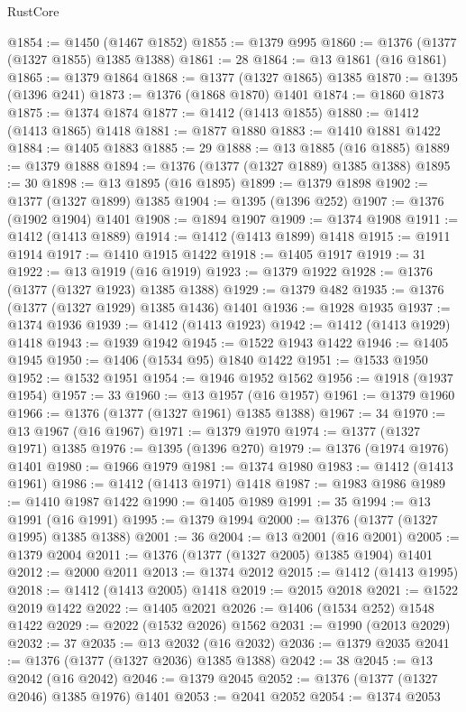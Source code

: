 \begin{lexlean}{RustCore}
\begin{coremodule}
@1854 := @1450 (@1467 @1852)
@1855 := @1379 @995
@1860 := @1376 (@1377 (@1327 @1855) @1385 @1388)
@1861 := 28
@1864 := @13 @1861 (@16 @1861)
@1865 := @1379 @1864
@1868 := @1377 (@1327 @1865) @1385
@1870 := @1395 (@1396 @241)
@1873 := @1376 (@1868 @1870) @1401
@1874 := @1860 @1873
@1875 := @1374 @1874
@1877 := @1412 (@1413 @1855)
@1880 := @1412 (@1413 @1865) @1418
@1881 := @1877 @1880
@1883 := @1410 @1881 @1422
@1884 := @1405 @1883
@1885 := 29
@1888 := @13 @1885 (@16 @1885)
@1889 := @1379 @1888
@1894 := @1376 (@1377 (@1327 @1889) @1385 @1388)
@1895 := 30
@1898 := @13 @1895 (@16 @1895)
@1899 := @1379 @1898
@1902 := @1377 (@1327 @1899) @1385
@1904 := @1395 (@1396 @252)
@1907 := @1376 (@1902 @1904) @1401
@1908 := @1894 @1907
@1909 := @1374 @1908
@1911 := @1412 (@1413 @1889)
@1914 := @1412 (@1413 @1899) @1418
@1915 := @1911 @1914
@1917 := @1410 @1915 @1422
@1918 := @1405 @1917
@1919 := 31
@1922 := @13 @1919 (@16 @1919)
@1923 := @1379 @1922
@1928 := @1376 (@1377 (@1327 @1923) @1385 @1388)
@1929 := @1379 @482
@1935 := @1376 (@1377 (@1327 @1929) @1385 @1436) @1401
@1936 := @1928 @1935
@1937 := @1374 @1936
@1939 := @1412 (@1413 @1923)
@1942 := @1412 (@1413 @1929) @1418
@1943 := @1939 @1942
@1945 := @1522 @1943 @1422
@1946 := @1405 @1945
@1950 := @1406 (@1534 @95) @1840 @1422
@1951 := @1533 @1950
@1952 := @1532 @1951
@1954 := @1946 @1952 @1562
@1956 := @1918 (@1937 @1954)
@1957 := 33
@1960 := @13 @1957 (@16 @1957)
@1961 := @1379 @1960
@1966 := @1376 (@1377 (@1327 @1961) @1385 @1388)
@1967 := 34
@1970 := @13 @1967 (@16 @1967)
@1971 := @1379 @1970
@1974 := @1377 (@1327 @1971) @1385
@1976 := @1395 (@1396 @270)
@1979 := @1376 (@1974 @1976) @1401
@1980 := @1966 @1979
@1981 := @1374 @1980
@1983 := @1412 (@1413 @1961)
@1986 := @1412 (@1413 @1971) @1418
@1987 := @1983 @1986
@1989 := @1410 @1987 @1422
@1990 := @1405 @1989
@1991 := 35
@1994 := @13 @1991 (@16 @1991)
@1995 := @1379 @1994
@2000 := @1376 (@1377 (@1327 @1995) @1385 @1388)
@2001 := 36
@2004 := @13 @2001 (@16 @2001)
@2005 := @1379 @2004
@2011 := @1376 (@1377 (@1327 @2005) @1385 @1904) @1401
@2012 := @2000 @2011
@2013 := @1374 @2012
@2015 := @1412 (@1413 @1995)
@2018 := @1412 (@1413 @2005) @1418
@2019 := @2015 @2018
@2021 := @1522 @2019 @1422
@2022 := @1405 @2021
@2026 := @1406 (@1534 @252) @1548 @1422
@2029 := @2022 (@1532 @2026) @1562
@2031 := @1990 (@2013 @2029)
@2032 := 37
@2035 := @13 @2032 (@16 @2032)
@2036 := @1379 @2035
@2041 := @1376 (@1377 (@1327 @2036) @1385 @1388)
@2042 := 38
@2045 := @13 @2042 (@16 @2042)
@2046 := @1379 @2045
@2052 := @1376 (@1377 (@1327 @2046) @1385 @1976) @1401
@2053 := @2041 @2052
@2054 := @1374 @2053

\end{coremodule}
\end{lexlean}
